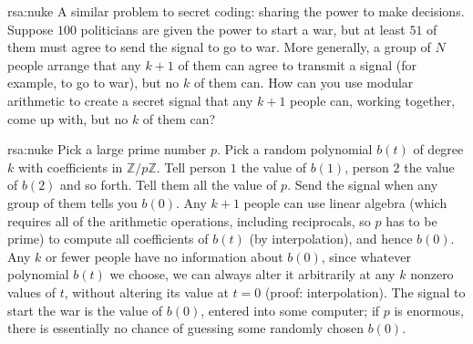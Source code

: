 \begin{problem*}{rsa:nuke}
A similar problem to secret coding: sharing the power to make decisions.
Suppose \(100\) politicians are given the power to start a war, but at least \(51\) of them must agree to send the signal to go to war.
More generally, a group of $N$ people arrange that any $k+1$ of them can agree to transmit a signal (for example, to go to war), but no $k$ of them can.
How can you use modular arithmetic to create a secret signal that any $k+1$ people can, working together, come up with, but no $k$ of them can?
\end{problem*}
\begin{answer}{rsa:nuke}
Pick a large prime number $p$.
Pick a random polynomial $b(t)$ of degree $k$ with coefficients in $\mathbb{Z}/p\mathbb{Z}$. 
Tell person $1$ the value of $b(1)$, person $2$ the value of $b(2)$ and so forth. 
Tell them all the value of $p$. 
Send the signal when any group of them tells you $b(0)$. 
Any $k+1$ people can use linear algebra (which requires all of the arithmetic operations, including reciprocals, so $p$ has to be prime) to compute all coefficients of $b(t)$ (by interpolation), and hence $b(0)$.
Any $k$ or fewer people have no information about $b(0)$, since whatever polynomial \(b(t)\) we choose, we can always alter it arbitrarily at any \(k\) nonzero values of \(t\), without altering its value at \(t=0\) (proof: interpolation).
The signal to start the war is the value of $b(0)$, entered into some computer; if $p$ is enormous, there is essentially no chance of guessing some randomly chosen $b(0)$.
\end{answer}

